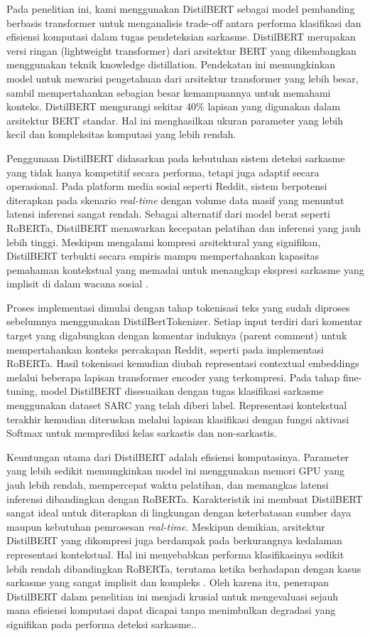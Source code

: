 Pada penelitian ini, kami menggunakan DistilBERT sebagai model pembanding berbasis transformer untuk menganalisis trade-off antara performa klasifikasi dan efisiensi komputasi dalam tugas pendeteksian sarkasme. DistilBERT merupakan versi ringan (lightweight transformer) dari arsitektur BERT yang dikembangkan menggunakan teknik knowledge distillation. Pendekatan ini memungkinkan model untuk mewarisi pengetahuan dari arsitektur transformer yang lebih besar, sambil mempertahankan sebagian besar kemampuannya untuk memahami konteks. DistilBERT mengurangi sekitar 40\% lapisan yang digunakan dalam arsitektur BERT standar. Hal ini menghasilkan ukuran parameter yang lebih kecil dan kompleksitas komputasi yang lebih rendah.

Penggunaan DistilBERT didasarkan pada kebutuhan sistem deteksi sarkasme yang tidak hanya kompetitif secara performa, tetapi juga adaptif secara operasional. Pada platform media sosial seperti Reddit, sistem berpotensi diterapkan pada skenario \textit{real-time} dengan volume data masif yang menuntut latensi inferensi sangat rendah. Sebagai alternatif dari model berat seperti RoBERTa, DistilBERT menawarkan kecepatan pelatihan dan inferensi yang jauh lebih tinggi. Meskipun mengalami kompresi arsitektural yang signifikan, DistilBERT terbukti secara empiris mampu mempertahankan kapasitas pemahaman kontekstual yang memadai untuk menangkap ekspresi sarkasme yang implisit di dalam wacana sosial \cite{dubey2025unpacking}.

Proses implementasi dimulai dengan tahap tokenisasi teks yang sudah diproses sebelumnya menggunakan DistilBertTokenizer. Setiap input terdiri dari komentar target yang digabungkan dengan komentar induknya (parent comment) untuk mempertahankan konteks percakapan Reddit, seperti pada implementasi RoBERTa. Hasil tokenisasi kemudian diubah representasi contextual embeddings melalui beberapa lapisan transformer encoder yang terkompresi. Pada tahap fine-tuning, model DistilBERT disesuaikan dengan tugas klasifikasi sarkasme menggunakan dataset SARC yang telah diberi label. Representasi kontekstual terakhir kemudian diteruskan melalui lapisan klasifikasi dengan fungsi aktivasi Softmax untuk memprediksi kelas sarkastis dan non-sarkastis.

Keuntungan utama dari DistilBERT adalah efisiensi komputasinya. Parameter yang lebih sedikit memungkinkan model ini menggunakan memori GPU yang jauh lebih rendah, mempercepat waktu pelatihan, dan memangkas latensi inferensi dibandingkan dengan RoBERTa. Karakteristik ini membuat DistilBERT sangat ideal untuk diterapkan di lingkungan dengan keterbatasan sumber daya maupun kebutuhan pemrosesan \textit{real-time}. Meskipun demikian, arsitektur DistilBERT yang dikompresi juga berdampak pada berkurangnya kedalaman representasi kontekstual. Hal ini menyebabkan performa klasifikasinya sedikit lebih rendah dibandingkan RoBERTa, terutama ketika berhadapan dengan kasus sarkasme yang sangat implisit dan kompleks \cite{dubey2025unpacking}. Oleh karena itu, penerapan DistilBERT dalam penelitian ini menjadi krusial untuk mengevaluasi sejauh mana efisiensi komputasi dapat dicapai tanpa menimbulkan degradasi yang signifikan pada performa deteksi sarkasme..

